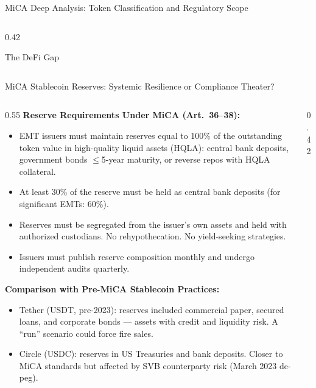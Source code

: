 \begin{frame}{MiCA Deep Analysis: Token Classification and Regulatory Scope}
\begin{columns}[T]
\begin{column}{0.42\textwidth}
\begin{alertblock}{The DeFi Gap}
      \end{alertblock}
    \end{column}
  \end{columns}
\end{frame}


\begin{frame}{MiCA Stablecoin Reserves: Systemic Resilience or Compliance Theater?}
  \begin{columns}[T]
    \begin{column}{0.55\textwidth}
      \textbf{Reserve Requirements Under MiCA (Art.\ 36--38):}
      \begin{itemize}
        \item EMT issuers must maintain reserves equal to 100\% of the outstanding token value in high-quality liquid assets (HQLA): central bank deposits, government bonds $\leq$5-year maturity, or reverse repos with HQLA collateral.
        \item At least 30\% of the reserve must be held as central bank deposits (for significant EMTs: 60\%).
        \item Reserves must be segregated from the issuer's own assets and held with authorized custodians. No rehypothecation. No yield-seeking strategies.
        \item Issuers must publish reserve composition monthly and undergo independent audits quarterly.
      \end{itemize}
      \vspace{0.3em}
      \textbf{Comparison with Pre-MiCA Stablecoin Practices:}
      \begin{itemize}
        \item Tether (USDT, pre-2023): reserves included commercial paper, secured loans, and corporate bonds --- assets with credit and liquidity risk. A ``run'' scenario could force fire sales.
        \item Circle (USDC): reserves in US Treasuries and bank deposits. Closer to MiCA standards but affected by SVB counterparty risk (March 2023 de-peg).
      \end{itemize}
    \end{column}
    \begin{column}{0.42\textwidth}

\end{column}
\end{columns}
\end{frame}
